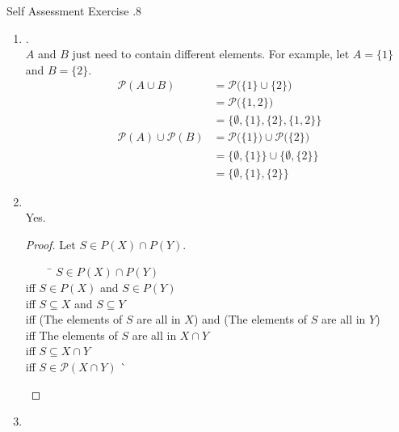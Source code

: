 \documentclass[../notes.tex]{subfiles}
\begin{document}
\begin{exercise}{Self Assessment Exercise \thechapter.8}
\begin{enumerate}
				\item {}.\\
					$A$ and $B$ just need to contain different elements. For example, let $A = \{1\}$ and $B = \{2\}$.
					\begin{align*}
						\mathcal{P}(A \cup B) &= \mathcal{P}\bigl(\{1\} \cup \{2\}\bigr)\\
						&= \mathcal{P}\bigl(\{1, 2\}\bigr)\\
						&= \bigl\{\emptyset, \{1\}, \{2\}, \{1, 2\}\bigr\}\\
						\mathcal{P}(A) \cup \mathcal{P}(B) &= \mathcal{P}\bigl(\{1\}\bigr) \cup \mathcal{P}\bigl(\{2\}\bigr)\\
						&= \bigl\{\emptyset, \{1\}\bigr\} \cup \bigl\{\emptyset, \{2\}\bigr\}\\
						&= \bigl\{\emptyset, \{1\}, \{2\}\bigr\}
					\end{align*}
				\pagebreak
				\item {}\\
					Yes.
					\begin{proof}
						Let $S \in P(X) \cap P(Y)$.
						\begin{tabbing}
							$\qquad$ \= $S \in P(X) \cap P(Y)$\\
							iff \> $S \in P(X)$ and $S \in P(Y)$\\
							iff \> $S \subseteq X$ and $S \subseteq Y$\\
							iff \> (The elements of $S$ are all in $X$) and (The elements of $S$ are all in $Y$)\\
							iff \> The elements of $S$ are all in $X \cap Y$\\
							iff \> $S \subseteq X \cap Y$\\
							iff \> $S \in \mathcal{P}(X \cap Y)$ \` \qedhere
						\end{tabbing}
					\end{proof}
				\item {}
					\begin{center}
						\begin{vennthree}[labelA=$X$, labelB=$Y$, labelC=$Z$, tikzoptions={scale=0.8}]

\end{vennthree}
\end{center}
\end{enumerate}
\end{exercise}
\end{document}
